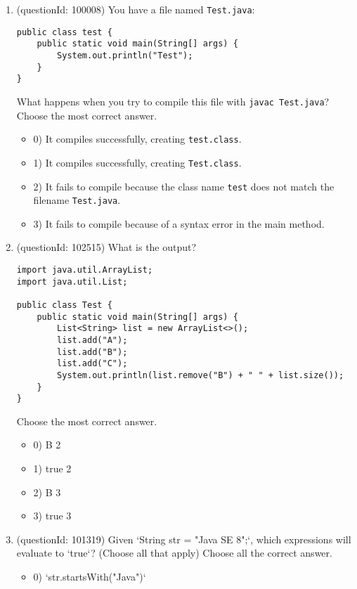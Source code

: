 \documentclass[12pt]{article}
\begin{document}
\begin{enumerate}[label=(\arabic*)]
\begin{itemize}
\end{itemize}
\item (questionId: 100008) You have a file named \verb|Test.java|:
\begin{verbatim}
public class test {
    public static void main(String[] args) {
        System.out.println("Test");
    }
}
\end{verbatim}
What happens when you try to compile this file with \verb|javac Test.java|?
Choose the most correct answer. 
\begin{itemize}
\item 0) It compiles successfully, creating \verb|test.class|.

\item 1) It compiles successfully, creating \verb|Test.class|.

\item 2) It fails to compile because the class name \verb|test| does not match the filename \verb|Test.java|.

\item 3) It fails to compile because of a syntax error in the main method.

\end{itemize}
\item (questionId: 102515) What is the output?\begin{verbatim}
import java.util.ArrayList;
import java.util.List;

public class Test {
    public static void main(String[] args) {
        List<String> list = new ArrayList<>();
        list.add("A");
        list.add("B");
        list.add("C");
        System.out.println(list.remove("B") + " " + list.size());
    }
}
\end{verbatim}
Choose the most correct answer. 
\begin{itemize}
\item 0) B 2

\item 1) true 2

\item 2) B 3

\item 3) true 3

\end{itemize}
\item (questionId: 101319) Given `String str = "Java SE 8";`, which expressions will evaluate to `true`? (Choose all that apply)
Choose all the correct answer.\begin{itemize}
\item 0) `str.startsWith("Java")`


\end{itemize}
\end{enumerate}
\end{document}

